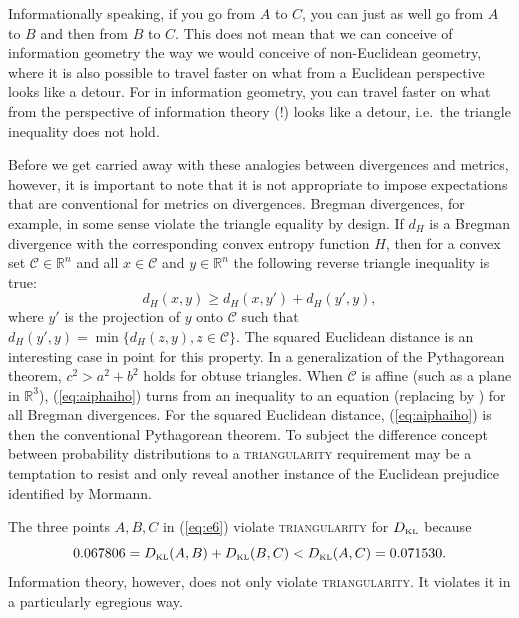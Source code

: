 \documentclass[12pt]{article}
\begin{document}
Informationally speaking, if you go from $A$ to $C$, you can just as
well go from $A$ to $B$ and then from $B$ to $C$. This does not mean
that we can conceive of information geometry the way we would conceive
of non-Euclidean geometry, where it is also possible to travel faster
on what from a Euclidean perspective looks like a detour. For in
information geometry, you can travel faster on what from the
perspective of information theory (!) looks like a detour, i.e.\ the
triangle inequality does not hold. 

Before we get carried away with these analogies between divergences
and metrics, however, it is important to note that it is not
appropriate to impose expectations that are conventional for metrics
on divergences. Bregman divergences, for example, in some sense
violate the triangle equality by design. If $d_{H}$ is a Bregman
divergence with the corresponding convex entropy function $H$, then
for a convex set $\mathcal{C}\in\mathbb{R}^{n}$ and all
$x\in{}\mathcal{C}$ and $y\in\mathbb{R}^{n}$ the following reverse
triangle inequality is true:
\begin{equation}
\label{eq:aiphaiho}
d_{H}(x,y)\geq{}d_{H}(x,y')+d_{H}(y',y), 
\end{equation}
where $y'$ is the projection of $y$ onto $\mathcal{C}$ such that
$d_{H}(y',y)=\min\{d_{H}(z,y),z\in{}\mathcal{C}\}$. The squared
Euclidean distance is an interesting case in point for this property.
In a generalization of the Pythagorean theorem, $c^{2}>a^{2}+b^{2}$
holds for obtuse triangles. When $\mathcal{C}$ is affine (such as a
plane in $\mathbb{R}^{3}$), (\ref{eq:aiphaiho}) turns from an
inequality to an equation (replacing \qnull{$\geq$} by \qnull{$=$})
for all Bregman divergences. For the squared Euclidean distance,
(\ref{eq:aiphaiho}) is then the conventional Pythagorean theorem. To
subject the difference concept between probability distributions to a
\textsc{triangularity} requirement may be a temptation to resist and
only reveal another instance of the Euclidean prejudice identified by
Mormann.


The three points $A,B,C$ in (\ref{eq:e6}) violate 
\textsc{triangularity} for $D_{\mbox{\tiny KL}}$ because
\begin{equation}
  \label{eq:yaifahge}
  0.067806=D_{\mbox{\tiny KL}}(A,B)+D_{\mbox{\tiny KL}}(B,C)<D_{\mbox{\tiny KL}}(A,C)=0.071530.
\end{equation}
Information theory, however, does not only violate
\textsc{triangularity}. It violates it in a particularly egregious
way.
\end{document}
